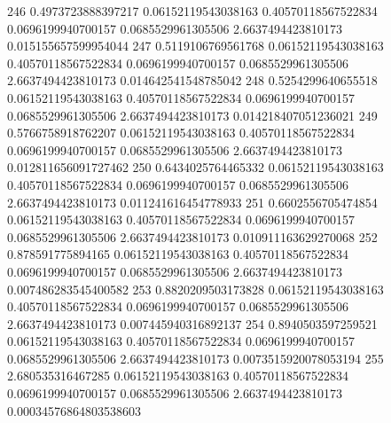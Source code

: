 {246 0.4973723888397217 0.06152119543038163 0.40570118567522834 0.0696199940700157 0.0685529961305506 2.6637494423810173 0.015155657599954044
247 0.5119106769561768 0.06152119543038163 0.40570118567522834 0.0696199940700157 0.0685529961305506 2.6637494423810173 0.014642541548785042
248 0.5254299640655518 0.06152119543038163 0.40570118567522834 0.0696199940700157 0.0685529961305506 2.6637494423810173 0.014218407051236021
249 0.5766758918762207 0.06152119543038163 0.40570118567522834 0.0696199940700157 0.0685529961305506 2.6637494423810173 0.012811656091727462
250 0.6434025764465332 0.06152119543038163 0.40570118567522834 0.0696199940700157 0.0685529961305506 2.6637494423810173 0.011241616454778933
251 0.6602556705474854 0.06152119543038163 0.40570118567522834 0.0696199940700157 0.0685529961305506 2.6637494423810173 0.010911163629270068
252 0.878591775894165 0.06152119543038163 0.40570118567522834 0.0696199940700157 0.0685529961305506 2.6637494423810173 0.007486283545400582
253 0.8820209503173828 0.06152119543038163 0.40570118567522834 0.0696199940700157 0.0685529961305506 2.6637494423810173 0.007445940316892137
254 0.8940503597259521 0.06152119543038163 0.40570118567522834 0.0696199940700157 0.0685529961305506 2.6637494423810173 0.0073515920078053194
255 2.680535316467285 0.06152119543038163 0.40570118567522834 0.0696199940700157 0.0685529961305506 2.6637494423810173 0.00034576864803538603
}\tableexpivwaitrlactcri
